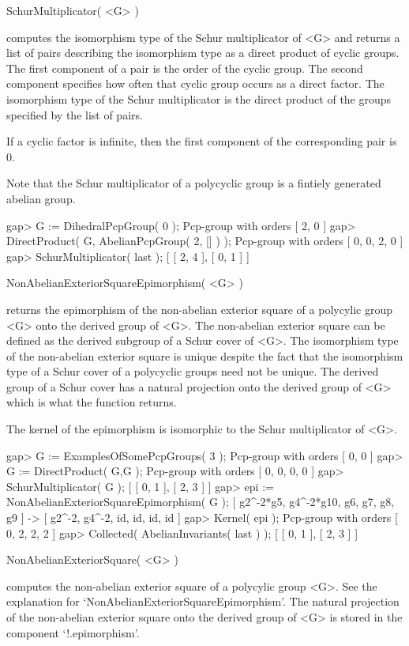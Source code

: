 \>SchurMultiplicator( <G> )

computes the  isomorphism type of  the Schur multiplicator of  <G> and
returns a  list of pairs describing  the isomorphism type  as a direct
product of cyclic groups.  The first  component of a pair is the order
of the  cyclic group.  The  second component specifies how  often that
cyclic group occurs  as a direct factor.  The  isomorphism type of the
Schur multiplicator is  the direct product of the  groups specified by
the list of pairs.

If  a cyclic  factor  is infinite,  then  the first  component of  the
corresponding  pair is  0.  

Note that the Schur multiplicator  of a polycyclic group is a fintiely
generated abelian group.
 
\beginexample
gap> G := DihedralPcpGroup( 0 );
Pcp-group with orders [ 2, 0 ]
gap> DirectProduct( G, AbelianPcpGroup( 2, [] ) );
Pcp-group with orders [ 0, 0, 2, 0 ]
gap> SchurMultiplicator( last );
[ [ 2, 4 ], [ 0, 1 ] ]
\endexample

\>NonAbelianExteriorSquareEpimorphism( <G> )

returns  the  epimorphism of  the  non-abelian  exterior  square of  a
polycylic group  <G> onto the  derived group of <G>.   The non-abelian
exterior  square can be  defined as  the derived  subgroup of  a Schur
cover of <G>.  The isomorphism type of the non-abelian exterior square
is unique despite the fact that  the isomorphism type of a Schur cover
of a  polycyclic groups need  not be unique.   The derived group  of a
Schur cover  has a  natural projection onto  the derived group  of <G>
which is what the function returns.

The kernel of the epimorphism is isomorphic to the Schur multiplicator
of <G>.

\beginexample
gap> G := ExamplesOfSomePcpGroups( 3 );
Pcp-group with orders [ 0, 0 ]
gap> G := DirectProduct( G,G );
Pcp-group with orders [ 0, 0, 0, 0 ]
gap> SchurMultiplicator( G );
[ [ 0, 1 ], [ 2, 3 ] ]
gap> epi := NonAbelianExteriorSquareEpimorphism( G );
[ g2^-2*g5, g4^-2*g10, g6, g7, g8, g9 ] -> [ g2^-2, g4^-2, id, id, id, id ]
gap> Kernel( epi );
Pcp-group with orders [ 0, 2, 2, 2 ]
gap> Collected( AbelianInvariants( last ) );
[ [ 0, 1 ], [ 2, 3 ] ]
\endexample

\>NonAbelianExteriorSquare( <G> )

computes the  non-abelian exterior  square of a  polycylic group  <G>. 
See  the explanation  for  `NonAbelianExteriorSquareEpimorphism'.  The
natural projection of the non-abelian exterior square onto the derived
group of <G> is stored in the component `!.epimorphism'.

